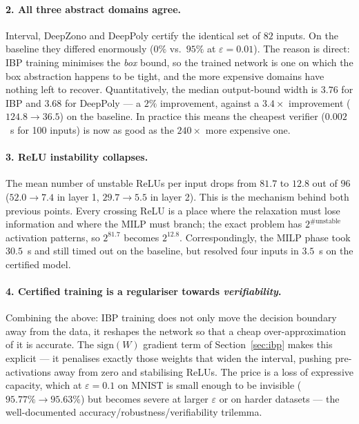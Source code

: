 \documentclass[11pt,a4paper]{article}
\newcommand{\eps}{\varepsilon}
\begin{document}
\paragraph{2. All three abstract domains agree.}
Interval, DeepZono and DeepPoly certify the identical set of $82$ inputs. On the
baseline they differed enormously ($0\%$ vs.\ $95\%$ at $\eps=0.01$). The reason
is direct: IBP training minimises the \emph{box} bound, so the trained network is
one on which the box abstraction happens to be tight, and the more expensive
domains have nothing left to recover. Quantitatively, the median output-bound
width is $3.76$ for IBP and $3.68$ for DeepPoly --- a $2\%$ improvement, against
a $3.4\times$ improvement ($124.8\to36.5$) on the baseline. In practice this
means the cheapest verifier ($0.002$~s for 100 inputs) is now as good as the
$240\times$ more expensive one.

\paragraph{3. ReLU instability collapses.}
The mean number of unstable ReLUs per input drops from $81.7$ to $12.8$ out of
$96$ ($52.0\to7.4$ in layer 1, $29.7\to5.5$ in layer 2). This is the mechanism
behind both previous points. Every crossing ReLU is a place where the relaxation
must lose information and where the MILP must branch; the exact problem has
$2^{\#\text{unstable}}$ activation patterns, so $2^{81.7}$ becomes $2^{12.8}$.
Correspondingly, the MILP phase took $30.5$~s and still timed out on the
baseline, but resolved four inputs in $3.5$~s on the certified model.

\paragraph{4. Certified training is a regulariser towards \emph{verifiability}.}
Combining the above: IBP training does not only move the decision boundary away
from the data, it reshapes the network so that a cheap over-approximation of it
is accurate. The $\mathrm{sign}(W)$ gradient term of Section~\ref{sec:ibp} makes
this explicit --- it penalises exactly those weights that widen the interval,
pushing pre-activations away from zero and stabilising ReLUs. The price is a
loss of expressive capacity, which at $\eps=0.1$ on MNIST is small enough to be
invisible ($95.77\%\to95.63\%$) but becomes severe at larger $\eps$ or on harder
datasets --- the well-documented accuracy/robustness/verifiability trilemma.
\end{document}
